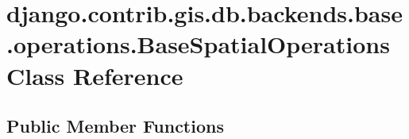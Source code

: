 \hypertarget{classdjango_1_1contrib_1_1gis_1_1db_1_1backends_1_1base_1_1operations_1_1_base_spatial_operations}{}\section{django.\+contrib.\+gis.\+db.\+backends.\+base.\+operations.\+Base\+Spatial\+Operations Class Reference}
\label{classdjango_1_1contrib_1_1gis_1_1db_1_1backends_1_1base_1_1operations_1_1_base_spatial_operations}
\subsection*{Public Member Functions}
